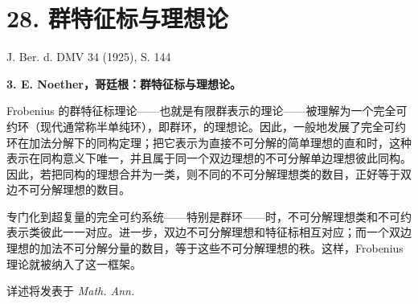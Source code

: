 \documentclass[11pt]{article}
\begin{document}
\section*{28. 群特征标与理想论}

\begin{center}
J. Ber. d. DMV 34 (1925), S. 144
\end{center}

\textbf{3. E. Noether，哥廷根：群特征标与理想论。}

Frobenius 的群特征标理论——也就是有限群表示的理论——被理解为一个完全可约环（现代通常称半单纯环），即群环，的理想论。因此，一般地发展了完全可约环在加法分解下的同构定理；把它表示为直接不可分解的简单理想的直和时，这种表示在同构意义下唯一，并且属于同一个双边理想的不可分解单边理想彼此同构。因此，若把同构的理想合并为一类，则不同的不可分解理想类的数目，正好等于双边不可分解理想的数目。

专门化到超复量的完全可约系统——特别是群环——时，不可分解理想类和不可约表示类彼此一一对应。进一步，双边不可分解理想和特征标相互对应；而一个双边理想的加法不可分解分量的数目，等于这些不可分解理想的秩。这样，Frobenius 理论就被纳入了这一框架。

详述将发表于 \emph{Math. Ann.}
\end{document}
